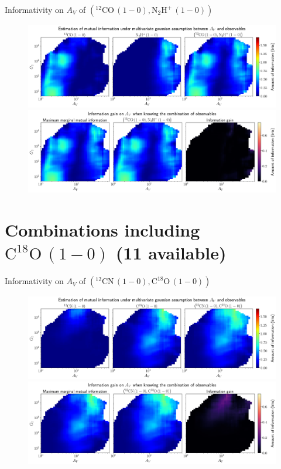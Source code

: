 \documentclass{beamer}
\begin{document}
\begin{frame}{Informativity on $A_V$ of $\left(\mathrm{^{12}CO\,(1-0)},\mathrm{N_2H^+\,(1-0)}\right)$}
    \begin{figure}
        \centering
        \includegraphics[width=0.95\linewidth]{../linearinfogauss/av__12co10_n2hp10_linearinfogauss.png}
        \vfill
        \includegraphics[width=0.95\linewidth]{../linearinfogauss/av__12co10_n2hp10_linearinfogauss_gain.png}
    \end{figure}
\end{frame}

\section{Combinations including $\mathrm{C^{18}O\,(1-0)}$ (11 available)}

\begin{frame}{Informativity on $A_V$ of $\left(\mathrm{^{12}CN\,(1-0)},\mathrm{C^{18}O\,(1-0)}\right)$}
    \begin{figure}
        \centering
        \includegraphics[width=0.95\linewidth]{../linearinfogauss/av__12cn10_c18o10_linearinfogauss.png}
        \vfill
        \includegraphics[width=0.95\linewidth]{../linearinfogauss/av__12cn10_c18o10_linearinfogauss_gain.png}
    \end{figure}
\end{frame}
\end{document}
